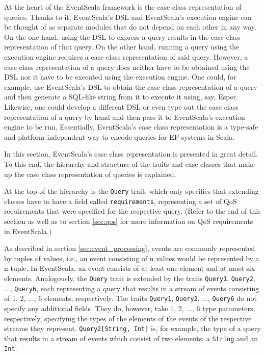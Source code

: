 \documentclass[article, 10pt, type=bsc, colorback, accentcolor=tud8b, parskip=half, bibliography=totocnumbered]{tudthesis}
\begin{document}
At the heart of the EventScala framework is the case class representation of queries.
Thanks to it, EventScala's DSL and EventScala's execution engine can be thought of as separate modules that do not depend on each other in any way.
On the one hand, using the DSL to express a query results in the case class representation of that query.
On the other hand, running a query using the execution engine requires a case class representation of said query.
However, a case class representation of a query does neither have to be obtained using the DSL nor it have to be executed using the execution engine.
One could, for example, use EventScala's DSL to obtain the case class representation of a query and then generate a SQL-like string from it to execute it using, say, Esper.
Likewise, one could develop a different DSL or even type out the case class representation of a query by hand and then pass it to EventScala's execution engine to be run.
Essentially, EventScala's case class representation is a type-safe and platform-independent way to encode queries for EP systems in Scala.

In this section, EventScala's case class representation is presented in great detail.
To this end, the hierarchy and structure of the traits and case classes that make up the case class representation of queries is explained.

At the top of the hierarchy is the \lstinline{Query} trait, which only specifies that extending classes have to have a field called \lstinline{requirements}, representing a set of QoS requirements that were specified for the respective query.
(Refer to the end of this section as well as to section \ref{sec:qos} for more information on QoS requirements in EventScala.)

As described in section \ref{sec:event_processing}, events are commonly represented by tuples of values, i.e., an event consisting of n values would be represented by a n-tuple.
In EventScala, an event consists of at least one element and at most six elements.
Analogously, the \lstinline{Query} trait is extended by the traits \lstinline{Query1}, \lstinline{Query2}, ..., \lstinline{Query6}, each representing a query that results in a stream of events consisting of 1, 2, ..., 6 elements, respectively.
The traits \lstinline{Query1}, \lstinline{Query2}, ..., \lstinline{Query6} do not specify any additional fields.
They do, however, take 1, 2, ..., 6 type parameters, respectively, specifying the types of the elements of the events of the respective streams they represent.
\lstinline{Query2[String, Int]} is, for example, the type of a query that results in a stream of events which consist of two elements: a \lstinline{String} and an \lstinline{Int}.
\end{document}
